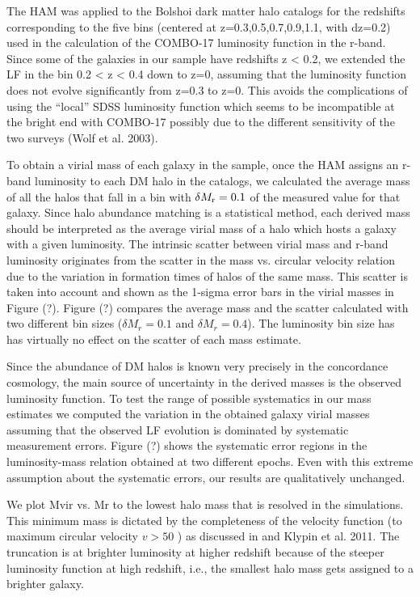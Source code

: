 \documentclass{emulateapj}
\begin{document}
The HAM was applied to the Bolshoi dark matter halo catalogs for the
redshifts corresponding to the five bins (centered at
z=0.3,0.5,0.7,0.9,1.1, with dz=0.2) used in the calculation of the
COMBO-17 luminosity function in the r-band. Since some of the galaxies
in our sample have redshifts z < 0.2, we extended the LF in the bin
0.2 < z < 0.4 down to z=0, assuming that the luminosity function does
not evolve significantly from z=0.3 to z=0. This avoids the
complications of using the ``local'' SDSS luminosity function which
seems to be incompatible at the bright end with COMBO-17 possibly due
to the different sensitivity of the two surveys (Wolf et al. 2003).

To obtain a virial mass of each galaxy in the sample, once the HAM
assigns an r-band luminosity to each DM halo in the catalogs, we
calculated the average mass of all the halos that fall in a bin with
$\delta M_{\rm r} = 0.1$ of the measured value for that galaxy. Since
halo abundance matching is a statistical method, each derived mass
should be interpreted as the average virial mass of a halo which hosts
a galaxy with a given luminosity. The intrinsic scatter between virial
mass and r-band luminosity originates from the scatter in the mass
vs. circular velocity relation due to the variation in formation times
of halos of the same mass. This scatter is taken into account and
shown as the 1-sigma error bars in the virial masses in Figure
(?). Figure (?) compares the average mass and the scatter calculated
with two different bin sizes ($\delta M_r = 0.1$ and $\delta M_r =
0.4$). The luminosity bin size has has virtually no effect on the
scatter of each mass estimate.

Since the abundance of DM halos is known very precisely in the
concordance cosmology, the main source of uncertainty in the derived
masses is the observed luminosity function. To test the range of
possible systematics in our mass estimates we computed the variation
in the obtained galaxy virial masses assuming that the observed LF
evolution is dominated by systematic measurement errors. Figure (?)
shows the systematic error regions in the luminosity-mass relation
obtained at two different epochs. Even with this extreme assumption
about the systematic errors, our results are qualitatively unchanged.

We plot Mvir vs. Mr to the lowest halo mass that is resolved in the
simulations.  This minimum mass is dictated by the completeness of the
velocity function (to maximum circular velocity $v>50$ {\kms}) as
discussed in \citet{trujillo-gomez11} and Klypin et al.  2011.  The
truncation is at brighter luminosity at higher redshift because of the
steeper luminosity function at high redshift, i.e., the smallest halo
mass gets assigned to a brighter galaxy.
\end{document}
